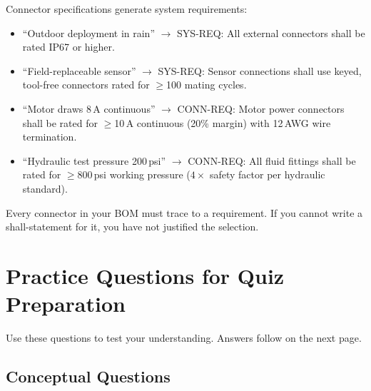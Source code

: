 \documentclass[11pt,letterpaper,twoside,openany]{book}
\begin{document}
\begin{keyconceptbox}
Connector specifications generate system requirements:
\begin{itemize}[nosep,leftmargin=1.5em]
\item ``Outdoor deployment in rain'' $\to$ SYS-REQ: All external connectors shall be rated IP67 or higher.
\item ``Field-replaceable sensor'' $\to$ SYS-REQ: Sensor connections shall use keyed, tool-free connectors rated for $\geq$100 mating cycles.
\item ``Motor draws 8\,A continuous'' $\to$ CONN-REQ: Motor power connectors shall be rated for $\geq$10\,A continuous (20\% margin) with 12\,AWG wire termination.
\item ``Hydraulic test pressure 200\,psi'' $\to$ CONN-REQ: All fluid fittings shall be rated for $\geq$800\,psi working pressure ($4\times$ safety factor per hydraulic standard).
\end{itemize}
Every connector in your BOM must trace to a requirement. If you cannot write a shall-statement for it, you have not justified the selection.
\end{keyconceptbox}

\section{Practice Questions for Quiz Preparation}

Use these questions to test your understanding. Answers follow on the next page.

\subsection{Conceptual Questions}
\end{document}
